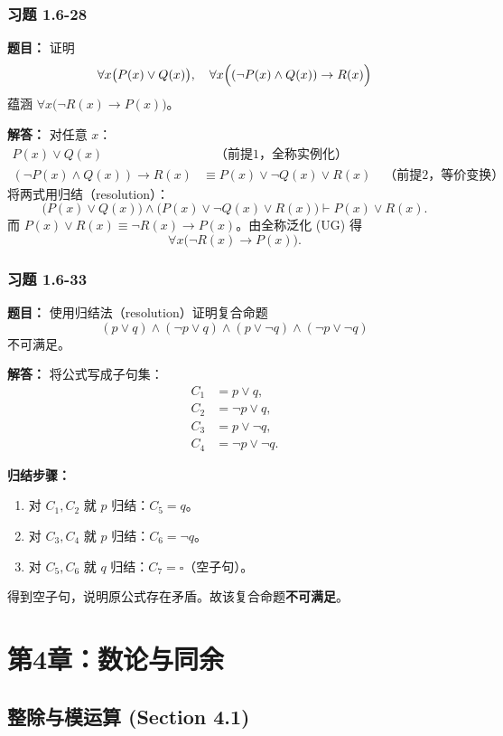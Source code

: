 \documentclass[11pt,UTF8]{article}
\begin{document}
\subsubsection*{习题 1.6-28}
\textbf{题目：} 证明
\[ \forall x\bigl(P(x)\lor Q(x)\bigr),\quad \forall x\Bigl((\neg P(x)\land Q(x))\to R(x)\Bigr) \]
蕴涵 $\forall x\bigl(\neg R(x)\to P(x)\bigr)$。

\textbf{解答：} 对任意 $x$：
\begin{align*}
P(x)\lor Q(x) &\quad\text{（前提1，全称实例化）}\\
(\neg P(x)\land Q(x))\to R(x) &\equiv P(x)\lor\neg Q(x)\lor R(x) \quad\text{（前提2，等价变换）}
\end{align*}
将两式用归结（resolution）：
\[ \bigl(P(x)\lor Q(x)\bigr)\land\bigl(P(x)\lor\neg Q(x)\lor R(x)\bigr) \vdash P(x)\lor R(x). \]
而 $P(x)\lor R(x)\equiv \neg R(x)\to P(x)$。由全称泛化 (UG) 得
\[ \forall x\bigl(\neg R(x)\to P(x)\bigr). \]

\subsubsection*{习题 1.6-33}
\textbf{题目：} 使用归结法（resolution）证明复合命题
\[ (p \lor q) \land (\neg p \lor q) \land (p \lor \neg q) \land (\neg p \lor \neg q) \]
不可满足。

\textbf{解答：} 将公式写成子句集：
\begin{align*}
C_1 &= p \lor q, \\
C_2 &= \neg p \lor q, \\
C_3 &= p \lor \neg q, \\
C_4 &= \neg p \lor \neg q.
\end{align*}

\textbf{归结步骤：}
\begin{enumerate}
    \item 对 $C_1, C_2$ 就 $p$ 归结：$C_5 = q$。
    \item 对 $C_3, C_4$ 就 $p$ 归结：$C_6 = \neg q$。
    \item 对 $C_5, C_6$ 就 $q$ 归结：$C_7 = \square$（空子句）。
\end{enumerate}

得到空子句，说明原公式存在矛盾。故该复合命题\textbf{不可满足}。


\newpage
\section{第4章：数论与同余}

\subsection{整除与模运算 (Section 4.1)}
\end{document}
